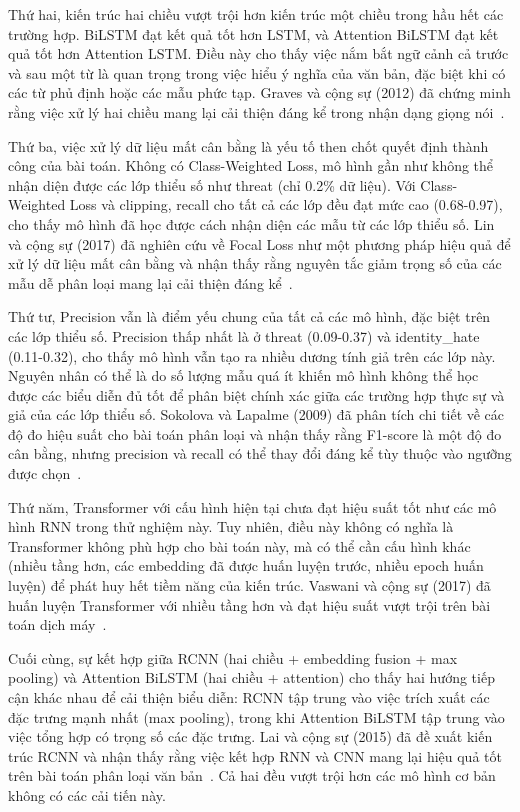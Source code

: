 \documentclass[../BTL.tex]{subfiles}
\begin{document}
Thứ hai, kiến trúc hai chiều vượt trội hơn kiến trúc một chiều trong hầu hết các trường hợp. BiLSTM đạt kết quả tốt hơn LSTM, và Attention BiLSTM đạt kết quả tốt hơn Attention LSTM. Điều này cho thấy việc nắm bắt ngữ cảnh cả trước và sau một từ là quan trọng trong việc hiểu ý nghĩa của văn bản, đặc biệt khi có các từ phủ định hoặc các mẫu phức tạp. Graves và cộng sự (2012) đã chứng minh rằng việc xử lý hai chiều mang lại cải thiện đáng kể trong nhận dạng giọng nói~\cite{graves2012supervised}.

Thứ ba, việc xử lý dữ liệu mất cân bằng là yếu tố then chốt quyết định thành công của bài toán. Không có Class-Weighted Loss, mô hình gần như không thể nhận diện được các lớp thiểu số như threat (chỉ 0.2\% dữ liệu). Với Class-Weighted Loss và clipping, recall cho tất cả các lớp đều đạt mức cao (0.68-0.97), cho thấy mô hình đã học được cách nhận diện các mẫu từ các lớp thiểu số. Lin và cộng sự (2017) đã nghiên cứu về Focal Loss như một phương pháp hiệu quả để xử lý dữ liệu mất cân bằng và nhận thấy rằng nguyên tắc giảm trọng số của các mẫu dễ phân loại mang lại cải thiện đáng kể~\cite{lin2017focal}.

Thứ tư, Precision vẫn là điểm yếu chung của tất cả các mô hình, đặc biệt trên các lớp thiểu số. Precision thấp nhất là ở threat (0.09-0.37) và identity\_hate (0.11-0.32), cho thấy mô hình vẫn tạo ra nhiều dương tính giả trên các lớp này. Nguyên nhân có thể là do số lượng mẫu quá ít khiến mô hình không thể học được các biểu diễn đủ tốt để phân biệt chính xác giữa các trường hợp thực sự và giả của các lớp thiểu số. Sokolova và Lapalme (2009) đã phân tích chi tiết về các độ đo hiệu suất cho bài toán phân loại và nhận thấy rằng F1-score là một độ đo cân bằng, nhưng precision và recall có thể thay đổi đáng kể tùy thuộc vào ngưỡng được chọn~\cite{sokolova2009systematic}.

Thứ năm, Transformer với cấu hình hiện tại chưa đạt hiệu suất tốt như các mô hình RNN trong thử nghiệm này. Tuy nhiên, điều này không có nghĩa là Transformer không phù hợp cho bài toán này, mà có thể cần cấu hình khác (nhiều tầng hơn, các embedding đã được huấn luyện trước, nhiều epoch huấn luyện) để phát huy hết tiềm năng của kiến trúc. Vaswani và cộng sự (2017) đã huấn luyện Transformer với nhiều tầng hơn và đạt hiệu suất vượt trội trên bài toán dịch máy~\cite{vaswani2017transformer}.

Cuối cùng, sự kết hợp giữa RCNN (hai chiều + embedding fusion + max pooling) và Attention BiLSTM (hai chiều + attention) cho thấy hai hướng tiếp cận khác nhau để cải thiện biểu diễn: RCNN tập trung vào việc trích xuất các đặc trưng mạnh nhất (max pooling), trong khi Attention BiLSTM tập trung vào việc tổng hợp có trọng số các đặc trưng. Lai và cộng sự (2015) đã đề xuất kiến trúc RCNN và nhận thấy rằng việc kết hợp RNN và CNN mang lại hiệu quả tốt trên bài toán phân loại văn bản~\cite{lai2015rcnn}. Cả hai đều vượt trội hơn các mô hình cơ bản không có các cải tiến này.
\end{document}
